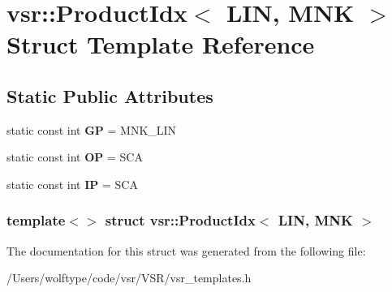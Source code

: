 \hypertarget{structvsr_1_1_product_idx_3_01_l_i_n_00_01_m_n_k_01_4}{\section{vsr\-:\-:Product\-Idx$<$ L\-I\-N, M\-N\-K $>$ Struct Template Reference}
\label{structvsr_1_1_product_idx_3_01_l_i_n_00_01_m_n_k_01_4}
}
\subsection*{Static Public Attributes}
\begin{DoxyCompactItemize}
\item 
\hypertarget{structvsr_1_1_product_idx_3_01_l_i_n_00_01_m_n_k_01_4_abe49d58b76aaf21af056fad3a2785010}{static const int {\bfseries G\-P} = M\-N\-K\-\_\-\-L\-I\-N}\label{structvsr_1_1_product_idx_3_01_l_i_n_00_01_m_n_k_01_4_abe49d58b76aaf21af056fad3a2785010}

\item 
\hypertarget{structvsr_1_1_product_idx_3_01_l_i_n_00_01_m_n_k_01_4_a92d18c058175cf081f9b348e18d9a36b}{static const int {\bfseries O\-P} = S\-C\-A}\label{structvsr_1_1_product_idx_3_01_l_i_n_00_01_m_n_k_01_4_a92d18c058175cf081f9b348e18d9a36b}

\item 
\hypertarget{structvsr_1_1_product_idx_3_01_l_i_n_00_01_m_n_k_01_4_a7c8489418c56f64d68440ddd52954a4d}{static const int {\bfseries I\-P} = S\-C\-A}\label{structvsr_1_1_product_idx_3_01_l_i_n_00_01_m_n_k_01_4_a7c8489418c56f64d68440ddd52954a4d}

\end{DoxyCompactItemize}
\subsubsection*{template$<$$>$ struct vsr\-::\-Product\-Idx$<$ L\-I\-N, M\-N\-K $>$}



The documentation for this struct was generated from the following file\-:\begin{DoxyCompactItemize}
\item 
/\-Users/wolftype/code/vsr/\-V\-S\-R/vsr\-\_\-templates.\-h\end{DoxyCompactItemize}
